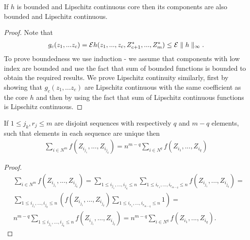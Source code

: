\begin{lemma}
\label{stm:LipAndBound}
 If $h$ is bounded and Lipschitz continuous core then its components are also bounded and Lipschitz continuous.
\end{lemma}
\begin{proof}
 Note that 
\begin{align}
g_c(z_1,...z_c) = \mathcal{E} h(z_1,...,z_c,Z_{c+1}^*,...,Z_{m}^*) \leq \mathcal{E} \parallel h \parallel_{\infty}.  
\end{align}
To prove boundedness  we use induction - we assume that components with low index are bounded and use the fact that sum of bounded functions is bounded to obtain the required results.
We prove Lipschitz continuity similarly, first by showing that $g_c(z_1,...z_c)$ are Lipschitz continuous with the same coefficient as the core $h$ and then by using the fact that sum of Lipschitz continuous functions  is  Lipschitz continuous.
\end{proof}


\begin{lemma}
\label{lem:summingLema}
If $1 \leq  j_k,r_j \leq m$ are disjoint sequences with respectively $q$ and $m-q$ elements, such that elements in each sequence are unique then
\begin{align}
\sum_{i \in N^m} f(Z_{i_{j_1}},...,Z_{i_{j_q}}) = n^{m-q} \sum_{i \in N^q} f(Z_{i_1},...,Z_{i_q})
\end{align}
\end{lemma}
\begin{proof}
\begin{align}
&\sum_{i \in N^m} f(Z_{i_{j_1}},...,Z_{i_{j_q}}) = \sum_{1 \leq i_{j_1},...,i_{j_q} \leq n}  \sum_{1 \leq i_{r_1},...,i_{r_{m-q}} \leq n} f(Z_{i_{j_1}},...,Z_{i_{j_q}}) = \\
&\sum_{1 \leq i_{j_1},...,i_{j_q} \leq n}  \left( f(Z_{i_{j_1}},...,Z_{i_{j_q}})  \sum_{1 \leq i_{r_1},...,i_{r_{m-q}} \leq n} 1 \right) =\\
&n^{m-q} \sum_{1 \leq i_{j_1},...,i_{j_q} \leq n}   f(Z_{i_{j_1}},...,Z_{i_{j_q}})  =n^{m-q} \sum_{i \in N^q} f(Z_{i_1},...,Z_{i_q}).
\end{align}
\end{proof}




